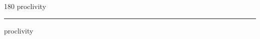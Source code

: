 
\begin{frame}
\begin{center}
\begin{turn}{180}
{\fontsize{2.5cm}{1em}\selectfont proclivity}
\end{turn}
\vspace{1em}\par  
\hrule
\vspace{1em}\par  
{\fontsize{2.5cm}{1em}\selectfont proclivity}
\end{center}
\end{frame}
